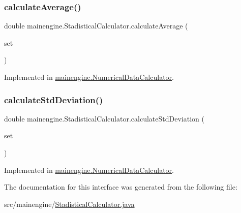 \subsubsection{\texorpdfstring{calculate\+Average()}{calculateAverage()}}
{\footnotesize\ttfamily double mainengine.\+Stadistical\+Calculator.\+calculate\+Average (\begin{DoxyParamCaption}\item[{Linked\+List$<$ Double $>$}]{set }\end{DoxyParamCaption})}



Implemented in \hyperlink{classmainengine_1_1_numerical_data_calculator_ac1f0d9cc0a35c84dc092b4c8b4fcd3ed}{mainengine.\+Numerical\+Data\+Calculator}.

\hypertarget{interfacemainengine_1_1_stadistical_calculator_a48e42fd096a3f1e8a0740355ddc104c3}{}\label{interfacemainengine_1_1_stadistical_calculator_a48e42fd096a3f1e8a0740355ddc104c3} 
\subsubsection{\texorpdfstring{calculate\+Std\+Deviation()}{calculateStdDeviation()}}
{\footnotesize\ttfamily double mainengine.\+Stadistical\+Calculator.\+calculate\+Std\+Deviation (\begin{DoxyParamCaption}\item[{Linked\+List$<$ Double $>$}]{set }\end{DoxyParamCaption})}



Implemented in \hyperlink{classmainengine_1_1_numerical_data_calculator_ab0ceb7615ed1d5df5b1cae8d47895e7a}{mainengine.\+Numerical\+Data\+Calculator}.



The documentation for this interface was generated from the following file\+:\begin{DoxyCompactItemize}
\item 
src/mainengine/\hyperlink{_stadistical_calculator_8java}{Stadistical\+Calculator.\+java}\end{DoxyCompactItemize}

